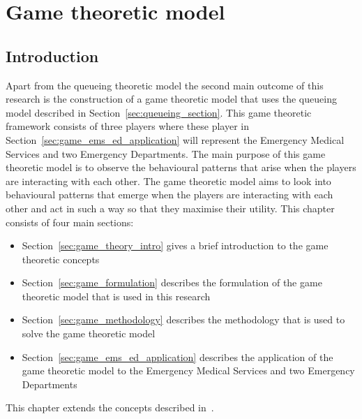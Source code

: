 \chapter{Game theoretic model}\label{sec:game_theoretic_model}


\section{Introduction}

Apart from the queueing theoretic model the second main outcome of this research
is the construction of a game theoretic model that uses the queueing model
described in Section~\ref{sec:queueing_section}.
This game theoretic framework consists of three players where these player in
Section~\ref{sec:game_ems_ed_application} will represent the Emergency Medical
Services and two Emergency Departments.
The main purpose of this game theoretic model is to observe the behavioural
patterns that arise when the players are interacting with each other.
The game theoretic model aims to look into behavioural patterns that emerge
when the players are interacting with each other and act in such a way so that
they maximise their utility. 
This chapter consists of four main sections:

\begin{itemize}
    \item Section~\ref{sec:game_theory_intro} gives a brief introduction to
    the game theoretic concepts
    \item Section~\ref{sec:game_formulation} describes the formulation of the
    game theoretic model that is used in this research
    \item Section~\ref{sec:game_methodology} describes the methodology that is
    used to solve the game theoretic model
    \item Section~\ref{sec:game_ems_ed_application} describes the application
    of the game theoretic model to the Emergency Medical Services and two
    Emergency Departments
\end{itemize}

This chapter extends the concepts described in~\cite{panayides2023game}.











